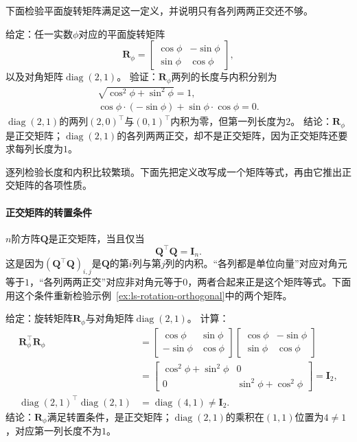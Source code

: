 下面检验平面旋转矩阵满足这一定义，并说明只有各列两两正交还不够。
\begin{example}[平面旋转是正交矩阵]
\label{ex:ls-rotation-orthogonal}
给定：任一实数$\phi$对应的平面旋转矩阵
\[
 \bm R_\phi=\begin{bmatrix}\cos\phi&-\sin\phi\\\sin\phi&\cos\phi\end{bmatrix},
\]
以及对角矩阵$\operatorname{diag}(2,1)$。
验证：$\bm R_\phi$两列的长度与内积分别为
\[
 \begin{gathered}
\sqrt{\cos^2\phi+\sin^2\phi}=1,\\
\cos\phi\cdot(-\sin\phi)+\sin\phi\cdot\cos\phi=0.
 \end{gathered}
\]
$\operatorname{diag}(2,1)$的两列$(2,0)^\top$与$(0,1)^\top$内积为零，但第一列长度为$2$。
结论：$\bm R_\phi$是正交矩阵；$\operatorname{diag}(2,1)$的各列两两正交，却不是正交矩阵，因为正交矩阵还要求每列长度为$1$。
\end{example}
逐列检验长度和内积比较繁琐。下面先把定义改写成一个矩阵等式，再由它推出正交矩阵的各项性质。

\paragraph{正交矩阵的转置条件}
$n$阶方阵$\bm Q$是正交矩阵，当且仅当
\[
 \bm Q^\top\bm Q=\bm I_n.
\]
这是因为$(\bm Q^\top\bm Q)_{i,j}$是$\bm Q$的第$i$列与第$j$列的内积。“各列都是单位向量”对应对角元等于$1$，“各列两两正交”对应非对角元等于$0$，两者合起来正是这个矩阵等式。下面用这个条件重新检验示例~\ref{ex:ls-rotation-orthogonal}中的两个矩阵。
\begin{example}[用转置条件检验正交矩阵]
\label{ex:ls-orthogonality-by-transpose}
给定：旋转矩阵$\bm R_\phi$与对角矩阵$\operatorname{diag}(2,1)$。
计算：
\[
 \begin{aligned}
 \bm R_\phi^\top\bm R_\phi
 &=\begin{bmatrix}\cos\phi&\sin\phi\\-\sin\phi&\cos\phi\end{bmatrix}
   \begin{bmatrix}\cos\phi&-\sin\phi\\\sin\phi&\cos\phi\end{bmatrix}\\
 &=\begin{bmatrix}\cos^2\phi+\sin^2\phi&0\\0&\sin^2\phi+\cos^2\phi\end{bmatrix}
 =\bm I_2,\\
 \operatorname{diag}(2,1)^\top\operatorname{diag}(2,1)&=\operatorname{diag}(4,1)\neq\bm I_2.
 \end{aligned}
\]
结论：$\bm R_\phi$满足转置条件，是正交矩阵；$\operatorname{diag}(2,1)$的乘积在$(1,1)$位置为$4\neq1$，对应第一列长度不为$1$。
\end{example}

